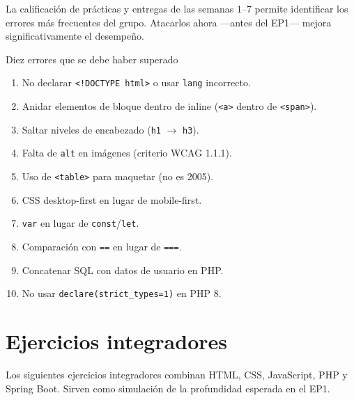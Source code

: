 \documentclass[11pt,a4paper,openany]{book}
\begin{document}
La calificación de prácticas y entregas de las semanas 1--7
permite identificar los errores más frecuentes del grupo. Atacarlos
ahora ---antes del EP1--- mejora significativamente el desempeño.


\begin{cajaadvertencia}{Diez errores que se debe haber superado}
\begin{enumerate}
\item No declarar \texttt{<!DOCTYPE html>} o usar \texttt{lang}
incorrecto.
\item Anidar elementos de bloque dentro de inline
(\texttt{<a>} dentro de \texttt{<span>}).
\item Saltar niveles de encabezado (\texttt{h1} $\to$ \texttt{h3}).
\item Falta de \texttt{alt} en imágenes (criterio WCAG 1.1.1).
\item Uso de \texttt{<table>} para maquetar (no es 2005).
\item CSS desktop-first en lugar de mobile-first.
\item \texttt{var} en lugar de \texttt{const}/\texttt{let}.
\item Comparación con \texttt{==} en lugar de \texttt{===}.
\item Concatenar SQL con datos de usuario en PHP.
\item No usar \texttt{declare(strict\_types=1)} en PHP 8.
\end{enumerate}
\end{cajaadvertencia}

\section{Ejercicios integradores}

Los siguientes ejercicios integradores combinan HTML, CSS,
JavaScript, PHP y Spring Boot. Sirven como simulación de la
profundidad esperada en el EP1.
\end{document}
